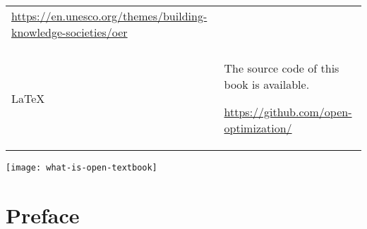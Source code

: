 \documentclass[../open-optimization/open-optimization.tex]{subfiles}
\begin{document}
\begin{tabular}{p{.3\linewidth}@{\qquad}p{.55\linewidth}}
\begin{minipage}[c]{\linewidth}
    \raggedleft
    \url{https://en.unesco.org/themes/building-knowledge-societies/oer}
  \end{minipage}
  \\\\[2ex]
  \begin{minipage}[c]{\linewidth}
    \centering\LARGE\LaTeX
  \end{minipage}
  & \begin{minipage}[c]{\linewidth}
    The source code of this book is available.\par\vspace{1ex}
    \raggedleft
    \url{https://github.com/open-optimization/}
  \end{minipage}
\end{tabular}

\begin{center}
\end{center}

\newpage

\texttt{[image: what-is-open-textbook]}\footnotemark
{}

\newpage

\section*{Preface}


\end{document}
